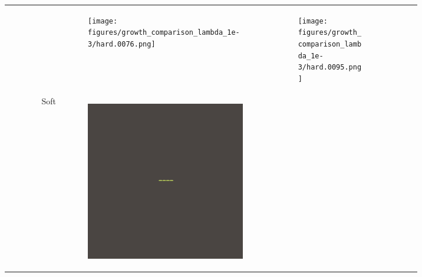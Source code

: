 \documentclass[conference]{IEEEtran}
\newlength{\subfigwidth}
\begin{document}
\begin{figure}
\begin{subfigure}[b]{\textwidth}
\begin{tabular}{r M{\subfigwidth} M{\subfigwidth} M{\subfigwidth} M{\subfigwidth} M{\subfigwidth} }
\begin{subfigure}[b]{\subfigwidth}
            \end{subfigure} &
            \begin{subfigure}[b]{\subfigwidth}
                \texttt{[image: figures/growth\_comparison\_lambda\_1e-3/hard.0076.png]}
            \end{subfigure} &
            \begin{subfigure}[t]{\subfigwidth}
                \texttt{[image: figures/growth\_comparison\_lambda\_1e-3/hard.0095.png]}
            \end{subfigure}    \\

            Soft                                                                                    &
            \begin{subfigure}[b]{\subfigwidth}
                \includegraphics[width=\textwidth]{figures/growth_comparison_lambda_1e-3/soft.0019.png}
            \end{subfigure} &
            \begin{subfigure}[b]{\subfigwidth}

\end{subfigure}
\end{tabular}
\end{subfigure}
\end{figure}
\end{document}

